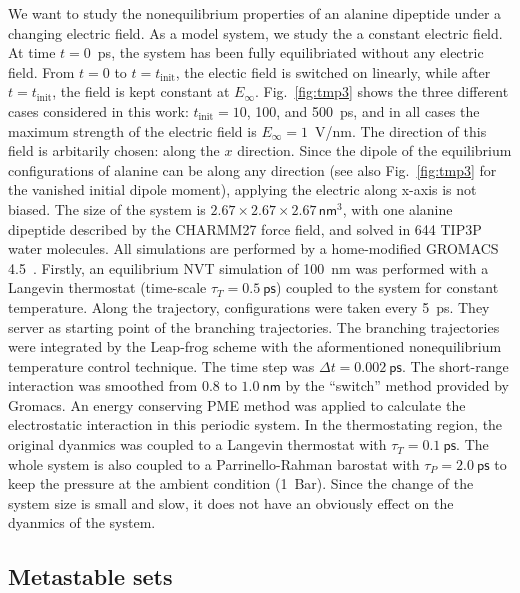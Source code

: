 \documentclass[aip,jcp,a4paper,preprint,onecolumn]{revtex4-1}
\begin{document}
We want to study the nonequilibrium properties of an alanine dipeptide
under a changing electric field. As a model system, we study the
a constant electric field. At time $t=0$~ps, the system
has been fully equilibriated without any electric field. From $t=0$ to
$t=t_{\textrm{init}}$, the electic field is switched on linearly, while
after $t=t_{\textrm{init}}$, the field is kept constant at
$E_{\infty}$. Fig.~\ref{fig:tmp3} shows the three different
cases considered in this work: $t_{\textrm{init}} = 10$, 100, and
500~ps, and 
in all cases the maximum strength of the electric field is
$E_{\infty} = 1$~V/nm.
The direction of this field is arbitarily chosen: along the
$x$ direction. Since the dipole of the equilibrium configurations of
alanine can be along any direction (see also Fig.~\ref{fig:tmp3} for
the vanished initial dipole moment), applying the electric along x-axis is
not biased.
The size of the system is $2.67\times 2.67\times
2.67\, \textsf{nm}^3$, with one alanine dipeptide described by the CHARMM27 force field, and solved in 644 TIP3P
water molecules.
All simulations are performed by a home-modified GROMACS 4.5~\cite{pronk2013gromacs}.
Firstly, an equilibrium NVT simulation of
100~\textsf{nm} was performed with a Langevin thermostat (time-scale
$\tau_T = 0.5~\textsf{ps}$) coupled to the system for constant
temperature.  Along the trajectory, configurations were taken every
5~\textsf{ps}.  They server as starting point of the branching
trajectories. The branching trajectories were integrated by the
Leap-frog scheme with the aformentioned nonequilibrium temperature control technique.  The
time step was $\Delta t = 0.002~\textsf{ps}$. The short-range
interaction was smoothed from $0.8$ to $1.0~\textsf{nm}$ by the
``switch'' method provided by Gromacs.  An energy conserving PME
method was applied to calculate the electrostatic interaction in this
periodic system. In the thermostating region, the original dyanmics was
coupled to a Langevin thermostat with $\tau_T = 0.1~\textsf{ps}$.
The whole system is also coupled to a Parrinello-Rahman barostat with $\tau_P = 2.0~\textsf{ps}$ to keep
the pressure at the ambient condition (1~Bar). Since the
change of the system size is small and slow, it does not have an obviously effect on the
dyanmics of the system.

\subsection{Metastable sets}
\end{document}

